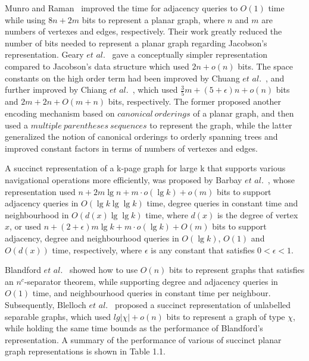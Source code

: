 \documentclass[12pt,glossary]{dalthesis}
\begin{document}
Munro and Raman~\cite{Munro} improved the time for adjacency queries to $O(1)$ time while using $8n+2m$ bits to represent a planar graph, where $n$ and $m$ are numbers of vertexes and edges, respectively. Their work greatly reduced the number of bits needed to represent a planar graph regarding Jacobson's representation. Geary $et$ $al.$~\cite{Geary} gave a conceptually simpler representation compared to Jacobson's data structure which used $2n+o(n)$ bits. The space constants on the high order term had been improved by Chuang $et$ $al.$~\cite{Chuang}, and further improved by Chiang $et$ $al.$~\cite{Chiang}, which used $\frac{3}{5} m + (5+ \epsilon )n + o(n)$ bits and  $2m+2n+O(m+n)$ bits, respectively. The former proposed another encoding mechanism based on $canonical \ orderings$ of a planar graph, and then used a $multiple \ parentheses \ sequences$ to represent the graph, while the latter generalized the notion of canonical orderings to orderly spanning trees and improved constant factors in terms of numbers of vertexes and edges. 

\bigskip
\bigskip

A succinct representation of a k-page graph for large k that supports various navigational operations more efficiently, was proposed by Barbay $et$ $al.$~\cite{Barbay}, whose representation used $n+2m\lg n + m \cdot o(\lg k) + o(m)$ bits to support adjacency queries in $O(\lg k \lg \lg k)$ time, degree queries in constant time and neighbourhood in $O(d(x) \lg \lg k)$ time, where $d(x)$ is the degree of vertex $x$, or used $n+(2+\epsilon)m\lg k + m \cdot o(\lg k) + O(m)$ bits to support adjacency, degree and neighbourhood queries in $O(\lg k)$, $O(1)$ and $O(d(x))$ time, respectively, where $\epsilon$ is any constant that satisfies $0< \epsilon <1$.   

\bigskip
\bigskip

Blandford $et$ $al.$~\cite{compact-representation} showed how to use $O(n)$ bits to represent graphs that satisfies an $n^{c}$-separator theorem, while supporting degree and adjacency queries in $O(1)$ time, and neighbourhood queries in constant time per neighbour. Subsequently, Blelloch $et$ $al.$~\cite{succinct-representation} proposed a succinct representation of unlabelled separable graphs, which used $lg| \chi |+ o(n)$ bits to represent a graph of type $\chi$, while holding the same time bounds as the performance of Blandford's representation. A summary of the performance of various of succinct planar graph representations is shown in Table 1.1.
    
\end{document}
